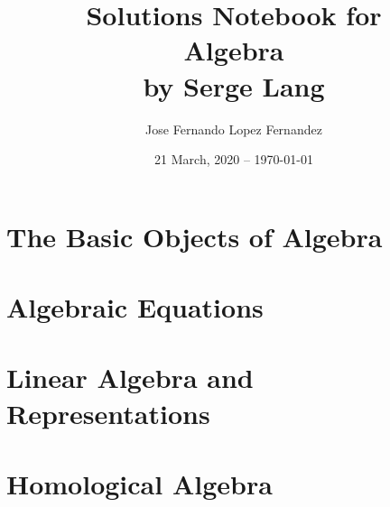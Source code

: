 \documentclass{book}
\title{Solutions Notebook for\\Algebra\\by Serge Lang}
\author{Jose Fernando Lopez Fernandez}
\date{21 March, 2020 -- \today}
\theoremstyle{definition}
\begin{document}
	\frontmatter
	\maketitle
	\tableofcontents
	\mainmatter
	\part{The Basic Objects of Algebra}
	
	\part{Algebraic Equations}
	\part{Linear Algebra and Representations}
	\part{Homological Algebra}
%	
%	
%	
%	
%	
%	
%	
%	
%	
%	
%	
%	
	\backmatter
	\printindex
\end{document}
